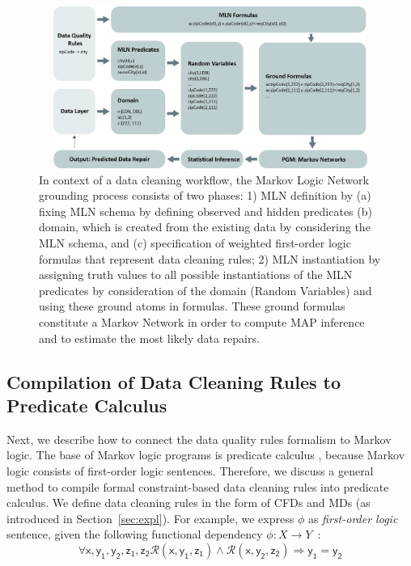 \begin{figure}[t]
 \centering
 \includegraphics[width=450px, height=200px]{img/mlogic-grounging.jpg}
 \caption{
 In context of a data cleaning workflow, the Markov Logic Network grounding process consists of two phases: 
 1) MLN definition by 
(a) fixing MLN schema by defining observed and hidden predicates
(b) domain, which is created from the existing data by considering the MLN schema, and 
(c) specification of weighted first-order logic formulas that represent data cleaning rules;
 2) MLN instantiation by assigning truth values to all possible instantiations of the MLN predicates by consideration of the domain (Random Variables) and using these ground atoms in formulas. These ground formulas constitute a Markov Network in order to compute MAP inference and to estimate the most likely data repairs.}
 \label{fig:mlngrounding}
\end{figure}

\subsection{Compilation of Data Cleaning Rules to \\Predicate Calculus}
\label{sec:ml} 

Next, we describe how to connect the data quality rules formalism to Markov logic. The base of Markov logic programs is predicate calculus \cite{genesereth1987logical}, because Markov logic consists of first-order logic sentences. Therefore, we discuss a general method to compile formal constraint-based data cleaning rules into predicate calculus. We define data cleaning rules in the form of CFDs and MDs (as introduced in Section~\ref{sec:expl}). For example, we express $\phi$ as \textit{first-order logic} sentence, given the following functional dependency $\phi: X \rightarrow Y$~\cite{Fagin:1982:HCD:322344.322347}:
\begin{equation}
\mathsf{\forall x, y_1, y_2, z_1, z_2 \mathcal{R}(x, y_1, z_1) \wedge \mathcal{R}(x, y_2, z_2) \Rightarrow y_1=y_2}
\label{fd2fol}
\end{equation}


